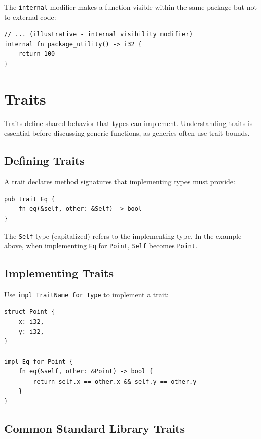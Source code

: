 The \texttt{internal} modifier makes a function visible within the same package but not to external code:

\begin{lstlisting}
// ... (illustrative - internal visibility modifier)
internal fn package_utility() -> i32 {
    return 100
}
\end{lstlisting}

\section{Traits}
\label{sec:traits}

Traits define shared behavior that types can implement. Understanding traits is essential before discussing generic functions, as generics often use trait bounds.

\subsection{Defining Traits}
\label{subsec:defining-traits}

A trait declares method signatures that implementing types must provide:

\begin{lstlisting}
pub trait Eq {
    fn eq(&self, other: &Self) -> bool
}
\end{lstlisting}

The \texttt{Self} type (capitalized) refers to the implementing type. In the example above, when implementing \texttt{Eq} for \texttt{Point}, \texttt{Self} becomes \texttt{Point}.

\subsection{Implementing Traits}
\label{subsec:implementing-traits}

Use \texttt{impl TraitName for Type} to implement a trait:

\begin{lstlisting}
struct Point {
    x: i32,
    y: i32,
}

impl Eq for Point {
    fn eq(&self, other: &Point) -> bool {
        return self.x == other.x && self.y == other.y
    }
}
\end{lstlisting}

\subsection{Common Standard Library Traits}
\label{subsec:common-traits}

